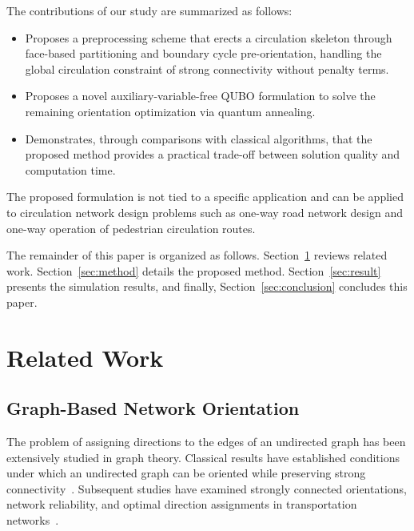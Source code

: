 \documentclass[twocolumn,a4paper]{article}
\begin{document}
The contributions of our study are summarized as follows:
\begin{itemize}
    \setlength{\itemsep}{0pt}
    \setlength{\parsep}{0pt}
    \setlength{\parskip}{0pt}
    \item[(1)] Proposes a preprocessing scheme that erects a circulation skeleton through face-based partitioning and boundary cycle pre-orientation, handling the global circulation constraint of strong connectivity without penalty terms.
    \item[(2)] Proposes a novel auxiliary-variable-free QUBO formulation to solve the remaining orientation optimization via quantum annealing.
    \item[(3)] Demonstrates, through comparisons with classical algorithms, that the proposed method provides a practical trade-off between solution quality and computation time.
\end{itemize}
The proposed formulation is not tied to a specific application and can be applied to circulation network design problems such as one-way road network design and one-way operation of pedestrian circulation routes.

The remainder of this paper is organized as follows. Section~\ref{sec:related} reviews related work. Section~\ref{sec:method} details the proposed method. Section~\ref{sec:result} presents the simulation results, and finally, Section~\ref{sec:conclusion} concludes this paper.

\section{Related Work} \label{sec:related}

\subsection{Graph-Based Network Orientation} \label{subsec:related_graph}

The problem of assigning directions to the edges of an undirected graph has been extensively studied in graph theory. Classical results have established conditions under which an undirected graph can be oriented while preserving strong connectivity~\cite{robbins1939theorem}. Subsequent studies have examined strongly connected orientations, network reliability, and optimal direction assignments in transportation networks~\cite{chung1985strongly, roberts1988optimal, roberts1994optimal}.
\end{document}
